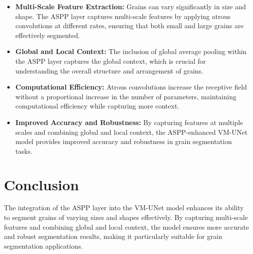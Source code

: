 \documentclass[conference]{IEEEtran}
\begin{document}
\begin{itemize}
    \item \textbf{Multi-Scale Feature Extraction:}
    Grains can vary significantly in size and shape. The ASPP layer captures multi-scale features by applying atrous convolutions at different rates, ensuring that both small and large grains are effectively segmented.

    \item \textbf{Global and Local Context:}
    The inclusion of global average pooling within the ASPP layer captures the global context, which is crucial for understanding the overall structure and arrangement of grains.

    \item \textbf{Computational Efficiency:}
    Atrous convolutions increase the receptive field without a proportional increase in the number of parameters, maintaining computational efficiency while capturing more context.

    \item \textbf{Improved Accuracy and Robustness:}
    By capturing features at multiple scales and combining global and local context, the ASPP-enhanced VM-UNet model provides improved accuracy and robustness in grain segmentation tasks.
\end{itemize}

\section{Conclusion}
The integration of the ASPP layer into the VM-UNet model enhances its ability to segment grains of varying sizes and shapes effectively. By capturing multi-scale features and combining global and local context, the model ensures more accurate and robust segmentation results, making it particularly suitable for grain segmentation applications.
\end{document}
